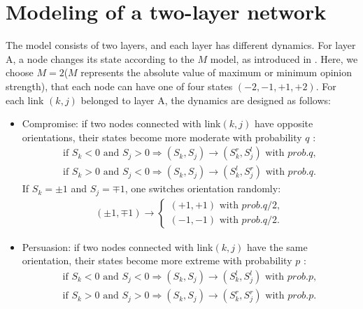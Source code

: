 \section{Modeling of a two-layer network}
\label{sec:modeling of two layer network}
The model consists of two layers, and each layer has different dynamics. For layer A, a node changes its state according to the $M$ model, as introduced in \parencite{rocca2014}. Here, we choose $M=2$($M$ represents the absolute value of maximum or minimum opinion strength), that each node can have one of four states $(-2, -1, +1, +2)$. For each link $(k, j)$ belonged to layer A, the dynamics are designed as follows:
\begin{itemize}
	\item Compromise: if two nodes connected with link$(k, j)$ have opposite orientations, their states become more moderate with probability $q$ :
	\begin{align}
	\mbox{if } S_k<0 \mbox{ and } S_j>0  \Rightarrow (S_k, S_j) \rightarrow (S_k^r, S_j^l) \mbox{ with } prob.q,\\
	\mbox{if } S_k>0 \mbox{ and } S_j<0  \Rightarrow (S_k, S_j) \rightarrow (S_k^l, S_j^r) \mbox{ with } prob.q.
	\end{align}
	If $S_k = \pm1$ and $S_j = \mp1$, one switches orientation randomly:
	\begin{align}
	(\pm 1, \mp 1)\rightarrow \left\{\begin{matrix}
	(+1, +1) \mbox{ with } prob.q/2,
	\\(-1, -1)\mbox{ with } prob.q/2.
	\end{matrix}\right.
	\end{align}
		
	\item Persuasion: if two nodes connected with link$(k, j)$ have the same orientation, their states become more extreme with probability $p$ :
	\begin{align}
	\mbox{if } S_k<0 \mbox{ and } S_j<0  \Rightarrow (S_k, S_j) \rightarrow (S_k^l, S_j^l) \mbox{ with } prob.p,\\
	\mbox{if } S_k>0 \mbox{ and } S_j>0  \Rightarrow (S_k, S_j) \rightarrow (S_k^r, S_j^r) \mbox{ with } prob.p.
	\end{align}
\end{itemize}

